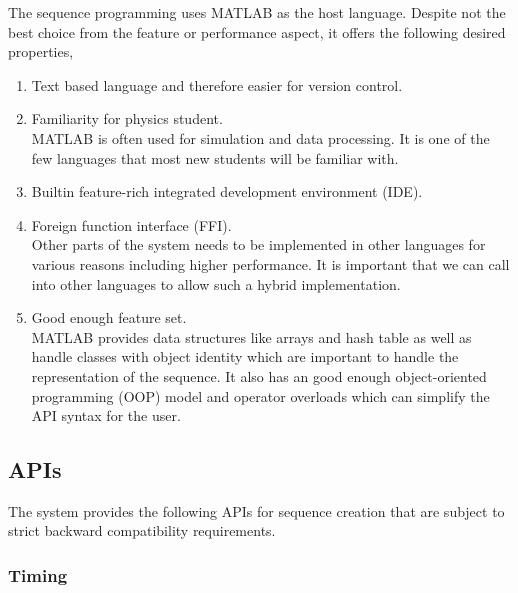 The sequence programming uses MATLAB as the host language.
Despite not the best choice from the feature or performance aspect,
it offers the following desired properties,
\begin{enumerate}
\item Text based language and therefore easier for version control.
\item Familiarity for physics student.\\
  MATLAB is often used for simulation and data processing.
  It is one of the few languages that most new students will be familiar with.
\item Builtin feature-rich integrated development environment (IDE).
\item Foreign function interface (FFI).\\
  Other parts of the system needs to be implemented in other languages
  for various reasons including higher performance.
  It is important that we can call into other languages to allow such a hybrid implementation.
\item Good enough feature set.\\
  MATLAB provides data structures like arrays and hash table
  as well as handle classes with object identity
  which are important to handle the representation of the sequence.
  It also has an good enough object-oriented programming (OOP) model
  and operator overloads which can simplify the API syntax for the user.
\end{enumerate}

\subsection{APIs}
The system provides the following APIs for sequence creation
that are subject to strict backward compatibility requirements.

\subsubsection{Timing}

